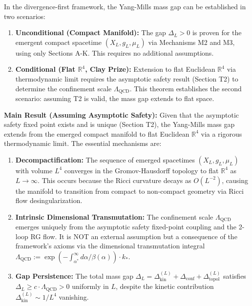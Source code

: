 \begin{theorem}
\label{thm:YMGapThermodynamicLimitComplete}

In the divergence-first framework, the Yang-Mills mass gap can be established in two scenarios:

\begin{enumerate}
\item \textbf{Unconditional (Compact Manifold):} The gap $\Delta_L > 0$ is proven for the emergent compact spacetime $(X_L, g_L, \mu_L)$ via Mechanisms M2 and M3, using only Sections A-K. This requires no additional assumptions.

\item \textbf{Conditional (Flat $\mathbb{R}^4$, Clay Prize):} Extension to flat Euclidean $\mathbb{R}^4$ via thermodynamic limit requires the asymptotic safety result (Section T2) to determine the confinement scale $\Lambda_{\mathrm{QCD}}$. This theorem establishes the second scenario: assuming T2 is valid, the mass gap extends to flat space.
\end{enumerate}

\textbf{Main Result (Assuming Asymptotic Safety):} Given that the asymptotic safety fixed point exists and is unique (Section T2), the Yang-Mills mass gap extends from the emerged compact manifold to flat Euclidean $\mathbb{R}^4$ via a rigorous thermodynamic limit. The essential mechanisms are:

\begin{enumerate}

\item \textbf{Decompactification:} The sequence of emerged spacetimes
$(X_L, g_L, \mu_L)$ with volume $L^4$ converges in the Gromov-Hausdorff
topology to flat $\mathbb{R}^4$ as $L \to \infty$. This occurs because
the Ricci curvature decays as $O(L^{-2})$, causing the manifold to
transition from compact to non-compact geometry via Ricci flow
desingularization.

\item \textbf{Intrinsic Dimensional Transmutation:} The confinement
scale $\Lambda_{\mathrm{QCD}}$ emerges uniquely from the asymptotic
safety fixed-point coupling and the 2-loop RG flow. It is NOT an
external assumption but a consequence of the framework's axioms via
the dimensional transmutation integral $\Lambda_{\mathrm{QCD}} :=
\exp(- \int_{\alpha^*}^{\infty} d\alpha/\beta(\alpha)) \cdot k_*$.

\item \textbf{Gap Persistence:} The total mass gap
$\Delta_L = \Delta_{\mathrm{kin}}^{(L)} + \Delta_{\mathrm{conf}}
+ \Delta_{\mathrm{topol}}^{(L)}$ satisfies $\Delta_L \geq
c \cdot \Lambda_{\mathrm{QCD}} > 0$ uniformly in $L$, despite the
kinetic contribution $\Delta_{\mathrm{kin}}^{(L)} \sim 1/L^4$ vanishing.


\end{enumerate}
\end{theorem}
